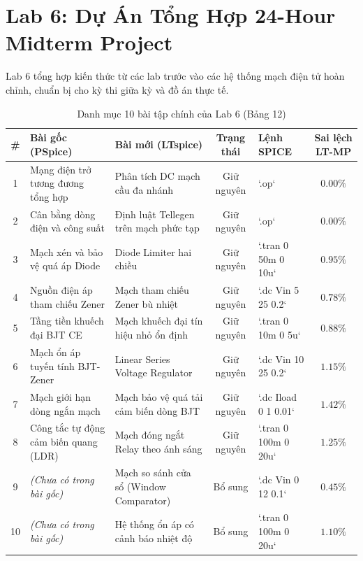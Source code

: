 \documentclass[12pt,a4paper]{report}
\begin{document}
\section{Lab 6: Dự Án Tổng Hợp 24-Hour Midterm Project}
Lab 6 tổng hợp kiến thức từ các lab trước vào các hệ thống mạch điện tử hoàn chỉnh, chuẩn bị cho kỳ thi giữa kỳ và đồ án thực tế.

\begin{table}[H]
\centering
\caption{Danh mục 10 bài tập chính của Lab 6 (Bảng 12)}
\label{tab:lab6_details}
\renewcommand{\arraystretch}{1.2}
\small
\begin{tabularx}{\textwidth}{|c|p{4.2cm}|p{4.0cm}|c|l|c|}
\hline
\rowcolor{codebg}
\textbf{\#} & \textbf{Bài gốc (PSpice)} & \textbf{Bài mới (LTspice)} & \textbf{Trạng thái} & \textbf{Lệnh SPICE} & \textbf{Sai lệch LT-MP} \\ \hline
1 & Mạng điện trở tương đương tổng hợp & Phân tích DC mạch cầu đa nhánh & Giữ nguyên & `.op` & $0.00\%$ \\ \hline
2 & Cân bằng dòng điện và công suất & Định luật Tellegen trên mạch phức tạp & Giữ nguyên & `.op` & $0.00\%$ \\ \hline
3 & Mạch xén và bảo vệ quá áp Diode & Diode Limiter hai chiều & Giữ nguyên & `.tran 0 50m 0 10u` & $0.95\%$ \\ \hline
4 & Nguồn điện áp tham chiếu Zener & Mạch tham chiếu Zener bù nhiệt & Giữ nguyên & `.dc Vin 5 25 0.2` & $0.78\%$ \\ \hline
5 & Tầng tiền khuếch đại BJT CE & Mạch khuếch đại tín hiệu nhỏ ổn định & Giữ nguyên & `.tran 0 10m 0 5u` & $0.88\%$ \\ \hline
6 & Mạch ổn áp tuyến tính BJT-Zener & Linear Series Voltage Regulator & Giữ nguyên & `.dc Vin 10 25 0.2` & $1.15\%$ \\ \hline
7 & Mạch giới hạn dòng ngắn mạch & Mạch bảo vệ quá tải cảm biến dòng BJT & Giữ nguyên & `.dc Iload 0 1 0.01` & $1.42\%$ \\ \hline
8 & Công tắc tự động cảm biến quang (LDR) & Mạch đóng ngắt Relay theo ánh sáng & Giữ nguyên & `.tran 0 100m 0 20u` & $1.25\%$ \\ \hline
9 & \textit{(Chưa có trong bài gốc)} & Mạch so sánh cửa sổ (Window Comparator) & Bổ sung & `.dc Vin 0 12 0.1` & $0.45\%$ \\ \hline
10 & \textit{(Chưa có trong bài gốc)} & Hệ thống ổn áp có cảnh báo nhiệt độ & Bổ sung & `.tran 0 100m 0 20u` & $1.10\%$ \\ \hline
\end{tabularx}
\end{table}
\end{document}
